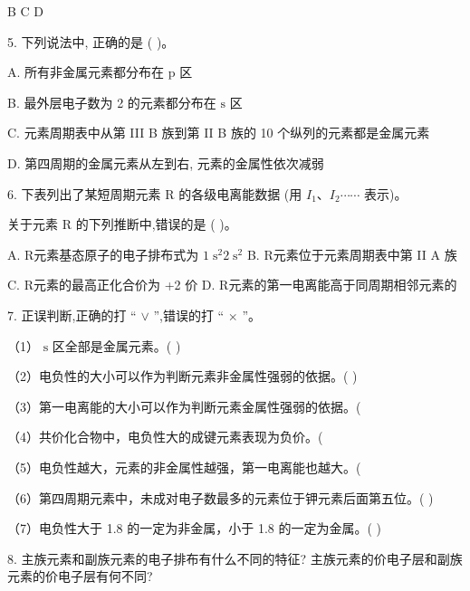 \documentclass[10pt]{article}
\begin{document}
B \(\mathrm{C}\) D

5. 下列说法中, 正确的是 ( )。

A. 所有非金属元素都分布在 \(\mathrm{p}\) 区

B. 最外层电子数为 2 的元素都分布在 \(\mathrm{s}\) 区

C. 元素周期表中从第 III B 族到第 II B 族的 10 个纵列的元素都是金属元素

D. 第四周期的金属元素从左到右, 元素的金属性依次减弱

6. 下表列出了某短周期元素 \(\mathrm{R}\) 的各级电离能数据 (用 \({I}_{1}\text{、}{I}_{2}\cdots \cdots\) 表示)。

\begin{center}
\end{center}

关于元素 \(\mathrm{R}\) 的下列推断中,错误的是 ( )。

A. R元素基态原子的电子排布式为 \(1{\mathrm{\;s}}^{2}2{\mathrm{\;s}}^{2}\) B. R元素位于元素周期表中第 II A 族

C. R元素的最高正化合价为 +2 价 D. R元素的第一电离能高于同周期相邻元素的

7. 正误判断,正确的打 “ \(\vee\) ”,错误的打 “ \(\times\) ”。

（1） \(\mathrm{s}\) 区全部是金属元素。( )

（2）电负性的大小可以作为判断元素非金属性强弱的依据。( )

（3）第一电离能的大小可以作为判断元素金属性强弱的依据。(

（4）共价化合物中，电负性大的成键元素表现为负价。(

（5）电负性越大，元素的非金属性越强，第一电离能也越大。(

（6）第四周期元素中，未成对电子数最多的元素位于钾元素后面第五位。( )

（7）电负性大于 1.8 的一定为非金属，小于 1.8 的一定为金属。( )

8. 主族元素和副族元素的电子排布有什么不同的特征? 主族元素的价电子层和副族元素的价电子层有何不同?
\end{document}

